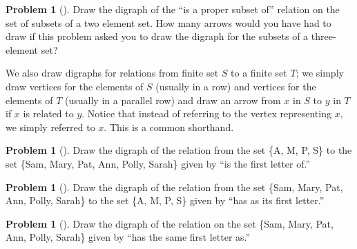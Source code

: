 \documentclass[10pt,]{book}
\theoremstyle{plain}
\theoremstyle{definition}
\newtheorem{activity}[project]{Problem}
\theoremstyle{definition}
\numberwithin{equation}{chapter}
\begin{document}
\begin{activity}[]\marginsymbol[-1em]{} \label{activity-332}
Draw the digraph of the ``is a proper subset of'' relation on the set of subsets of a two element set. How many arrows would you have had to draw if this problem asked you to draw the digraph for the subsets of a three-element set?%
\end{activity}
We also draw digraphs for relations from finite set \(S\) to a finite set \(T\); we simply draw vertices for the elements of \(S\) (usually in a row) and vertices for the elements of \(T\) (usually in a parallel row) and draw an arrow from \(x\) in \(S\) to \(y\) in \(T\) if \(x\) is related to \(y\). Notice that instead of referring to the vertex representing \(x\), we simply referred to \(x\). This is a common shorthand.%
\begin{activity}[]\marginsymbol[-1em]{} \label{initialdigraph}
Draw the digraph of the relation from the set \{A, M, P, S\} to the set \{Sam, Mary, Pat, Ann, Polly, Sarah\} given by ``is the first letter of.''%
\end{activity}
\begin{activity}[]\marginsymbol[-1em]{} \label{initialdigraph2}
Draw the digraph of the relation from the set \{Sam, Mary, Pat, Ann, Polly, Sarah\} to the set \{A, M, P, S\} given by ``has as its first letter.''%
\end{activity}
\begin{activity}[]\marginsymbol[-1em]{} \label{activity-335}
Draw the digraph of the relation on the set \{Sam, Mary, Pat, Ann, Polly, Sarah\} given by ``has the same first letter as.''%
\end{activity}
\typeout{************************************************}
\typeout{************************************************}
\end{document}
